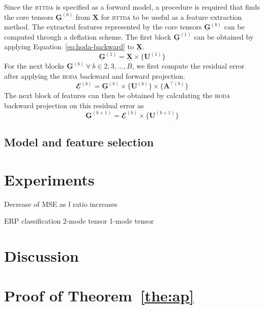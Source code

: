 \documentclass[twocolumn]{article}
\newcommand{\ten}[1]{\underline{\mathbf{#1}}} %
\newcommand{\mat}[1]{\mathbf{#1}} %
\newcommand{\mmpr}[1]{\times\{#1\}} %
\begin{document}
Since the \textsc{bttda} is specified as a forward model, a procedure is
required that finds the core tensors $\ten{G}^(b)$ from $\ten{X}$ for
\textsc{bttda} to be useful as a feature extraction method.
The extracted features represented by the core tensors $\ten{G}^{(b)}$ can be
computed through a deflation scheme.
The first block $\ten{G}^{(1)}$ can be obtained by applying
Equation~\ref{eq:hoda-backward} to $\ten{X}$.
\begin{equation}
  \ten{G}^{(1)} = \ten{X}\mmpr{\mat{U}^{(1)}}
\end{equation}
For the next blocks $\ten{G}^{(b)}~\forall~ b\in2,3,\ldots,B$, we first compute
the residual error after applying the \textsc{hoda} backward and forward
projection.
\begin{equation}
  \ten{\mathbfcal{E}}^{(b)} =
  \ten{G}^{(b)}\mmpr{\mat{U}^{(b)}}\mmpr{\mat{A}^{\intercal(b)}}
\end{equation}
The next block of features can then be obtained by calculating the
\textsc{hoda} backward projection on this residual error as
\begin{equation}
  \ten{G}^{(b+1)} = \ten{\mathbfcal{E}}^{(b)}\mmpr{\mat{U}^{(b+1)}}
\end{equation}



\subsection{Model and feature selection}

\section{Experiments}

Decrease of MSE as f ratio increases

ERP classification
2-mode tensor
1-mode tensor

\section{Discussion}


\printbibliography

\appendix
\section{Proof of Theorem~\ref{the:ap}}
\end{document}
